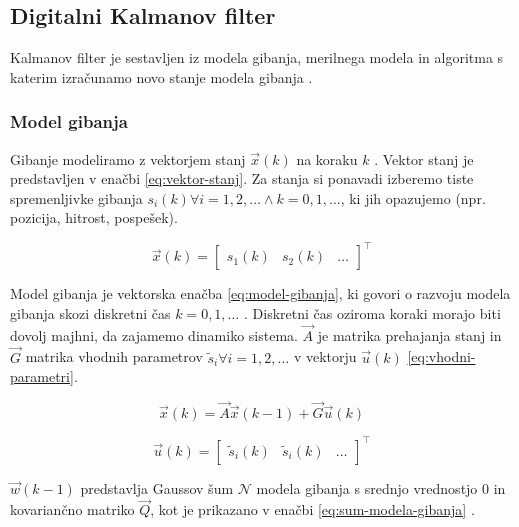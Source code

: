 \subsection{Digitalni Kalmanov filter}\label{sec:kalmanov-filter}
Kalmanov filter je sestavljen iz modela gibanja, merilnega modela in algoritma s katerim izračunamo novo stanje modela gibanja \cite{trucco1998introductory}.

\subsubsection{Model gibanja}
Gibanje modeliramo z vektorjem stanj $\vec{x}(k)$ na koraku $k$ \cite{trucco1998introductory}. Vektor stanj je predstavljen v enačbi \eqref{eq:vektor-stanj}. Za stanja si ponavadi izberemo tiste spremenljivke gibanja $s_i(k) \forall i = 1,2,\ldots \land k = 0, 1,\ldots$, ki jih opazujemo (npr. pozicija, hitrost, pospešek).

\begin{equation}
\vec{x}(k) = \begin{bmatrix}
					s_1(k) & s_2(k) & \ldots
\end{bmatrix}^\top
\label{eq:vektor-stanj} 
\end{equation}


Model gibanja je vektorska enačba \eqref{eq:model-gibanja}, ki govori o razvoju modela gibanja skozi diskretni čas $k = 0,1,\ldots$ \cite{trucco1998introductory}. Diskretni čas oziroma koraki morajo biti dovolj majhni, da zajamemo dinamiko sistema. $\vec{A}$ je matrika prehajanja stanj in $\vec{G}$ matrika vhodnih parametrov $\tilde{s}_i \forall i = 1,2,\ldots$ v vektorju $\vec{u}(k)$ \eqref{eq:vhodni-parametri}. 



\begin{equation}
\vec{x}(k) = \vec{A} \vec{x}(k-1) + \vec{G} \vec{u}(k)
\label{eq:model-gibanja}
\end{equation}

\begin{equation}
\vec{u}(k) = \begin{bmatrix}
					\tilde{s}_i(k) & \tilde{s}_i(k) & \ldots
			\end{bmatrix}^\top 
\label{eq:vhodni-parametri}
\end{equation}

$\vec{w}(k-1)$ predstavlja Gaussov šum $\mathcal{N}$ modela gibanja s srednjo vrednostjo $0$ in kovariančno matriko $\vec{Q}$, kot je prikazano v enačbi \eqref{eq:sum-modela-gibanja} \cite{trucco1998introductory}.

